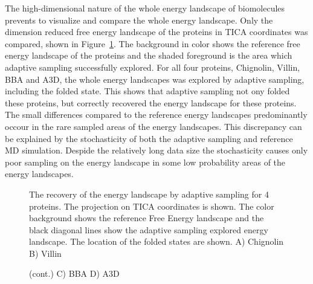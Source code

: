 The high-dimensional nature of the whole energy landscape of biomolecules prevents to visualize and compare the whole energy landscape. Only the dimension reduced free energy landscape of the proteins in TICA coordinates was compared, shown in Figure~\ref{fig:overlap}. The background in color shows the reference free energy landscape of the proteins and the shaded foreground is the area which adaptive sampling successfully explored. For all four proteins, Chignolin, Villin, BBA and A3D, the whole energy landscapes was explored by adaptive sampling, including the folded state. This shows that adaptive sampling not ony folded these proteins, but correctly recovered the energy landscape for these proteins.  The small differences compared to the reference energy landscapes predominantly occour in the rare sampled areas of the energy landscapes. This discrepancy can be explained by the stochasticity of both the adaptive sampling and reference MD simulation. Despide the relatively long data size the stochasticity causes only poor sampling on the energy landscape in some low probability areas of the energy landscapes.  


\begin{figure}[H]
\centering
   \begin{subfigure}[b]{0.6\linewidth}
   {}
   \end{subfigure}%
   
   \begin{subfigure}[b]{0.6\linewidth}
   {}
   \end{subfigure}%


  \caption{The recovery of the energy landscape by adaptive sampling for 4 proteins. The projection on TICA coordinates is shown. The
 color background shows the reference Free Energy landscape and the black diagonal lines show the adaptive sampling explored energy landscape. The location of the folded states are shown.  A) Chignolin B) Villin }
\end{figure}

\begin{figure}[H]\ContinuedFloat
\centering
   \begin{subfigure}[b]{0.6\linewidth}
   {}
   \end{subfigure}%
  
   \begin{subfigure}[b]{0.6\linewidth}
   {}
   \end{subfigure}%

  \caption{(cont.) C) BBA D) A3D} 
  \label{fig:overlap}
\end{figure}

